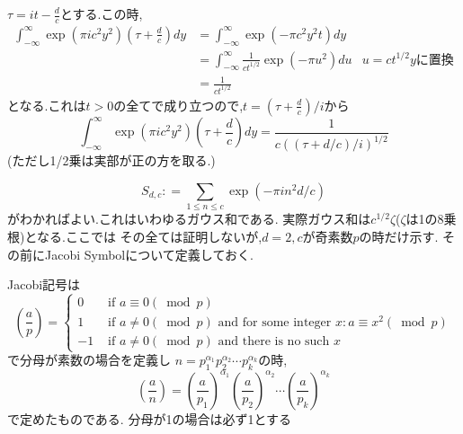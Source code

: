 $\tau = it - \frac{d}{c}$とする.この時,
\begin{align*}
\int_{- \infty}^{\infty}\exp(\pi i c^2y^2)(\tau + \frac{d}{c})dy
& = \int_{- \infty}^{\infty}\exp(- \pi c^2 y^2 t)dy \\
& = \int_{- \infty}^{\infty}\frac{1}{c t^{1/2}}\exp(- \pi u^2)du & u = c t^{1/2}y \mbox{に置換} \\
& = \frac{1}{c t^{1/2}}
\end{align*}
となる.これは$t > 0$の全てで成り立つので,$t= (\tau + \frac{d}{c}) / i$から
\begin{equation*}
\int_{- \infty}^{\infty}\exp(\pi i c^2y^2)(\tau + \frac{d}{c})dy = \frac{1}{ c \left( (\tau + d/c) / i\right)^{1/2}}
\end{equation*}
(ただし1/2乗は実部が正の方を取る.)

\begin{equation*}
 S_{d,c}: = \sum_{1\le n \le c} \exp(-\pi i n^2 d/c)
\end{equation*}
がわかればよい.これはいわゆるガウス和である.
実際ガウス和は$c^{1/2} \zeta$($\zeta$は1の8乗根)となる.ここでは
その全ては証明しないが,$d=2, c$が奇素数$p$の時だけ示す.
その前にJacobi Symbolについて定義しておく.

Jacobi記号は
\begin{equation*}
\left(\frac{a}{p}\right)=\left\{\begin{aligned} 0 & \text { if } a \equiv 0(\bmod p) \\ 1 & \text { if } a \neq 0(\bmod p) \text { and for some integer } x: a \equiv x^{2}(\bmod p) \\-1 & \text { if } a \neq 0(\bmod p) \text { and there is no such } x \end{aligned}\right.
\end{equation*}
で分母が素数の場合を定義し
$n=p_{1}^{\alpha_{1}} p_{2}^{\alpha_{2}} \cdots p_{k}^{\alpha_{k}}$の時,
\begin{equation*}
\left(\frac{a}{n}\right)=\left(\frac{a}{p_{1}}\right)^{\alpha_{1}}\left(\frac{a}{p_{2}}\right)^{\alpha_{2}} \cdots\left(\frac{a}{p_{k}}\right)^{\alpha_{k}}
\end{equation*}
で定めたものである.
分母が1の場合は必ず1とする

